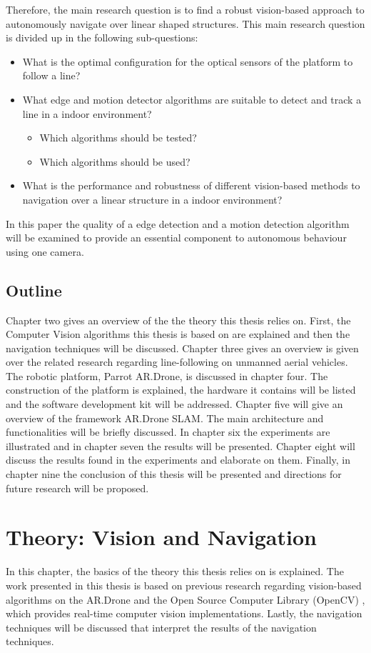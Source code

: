 \documentclass[a4paper]{article}
\begin{document}
Therefore, the main research question is to find a robust vision-based approach to autonomously navigate over linear shaped structures. This main research question is divided up in the following sub-questions:
\begin{itemize}
\item What is the optimal configuration for the optical sensors of the platform to follow a line?
\item What edge and motion detector algorithms are suitable to detect and track a line in a indoor environment?
	\begin{itemize}
	\item Which algorithms should be tested?
	\item Which algorithms should be used?
	\end{itemize}
\item What is the performance and robustness of different vision-based methods to navigation over a linear structure in a indoor environment?
\end{itemize}
In this paper the quality of a edge detection and a motion detection algorithm will be examined to provide an essential component to autonomous behaviour using one camera.

\subsection{Outline}
Chapter two gives an overview of the the theory this thesis relies on. First, the Computer Vision algorithms this thesis is based on are explained and then the navigation techniques will be discussed. Chapter three gives an overview is given over the related research regarding line-following on unmanned aerial vehicles. The robotic platform, Parrot AR.Drone, is discussed in chapter four. The construction of the platform is explained, the hardware it contains will be listed and the software development kit will be addressed. Chapter five will give an overview of the framework AR.Drone SLAM. The main architecture and functionalities will be briefly discussed. In chapter six the experiments are illustrated and in chapter seven the results will be presented. Chapter eight will discuss the results found in the experiments and elaborate on them. Finally, in chapter nine the conclusion of this thesis will be presented and directions for future research will be proposed.

\newpage
\section{Theory: Vision and Navigation}
In this chapter, the basics of the theory this thesis relies on is explained. The work presented in this thesis is based on previous research regarding vision-based algorithms on the AR.Drone \cite{Jurriaans2011} and the Open Source Computer Library (OpenCV) \cite{Bradski2008}, which provides real-time computer vision implementations. Lastly, the navigation techniques will be discussed that interpret the results of the navigation techniques.
\end{document}
